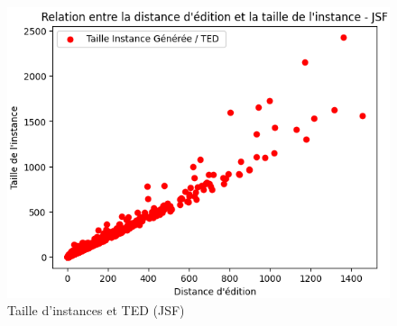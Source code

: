         \begin{figure}[H]\ContinuedFloat
          \centering
          \includegraphics[scale=0.5]{Photos/ted_vs_errors/taille_vs_ted_jSF.PNG}
          \caption{Taille d'instances et TED (JSF)}
        \end{figure}
      

